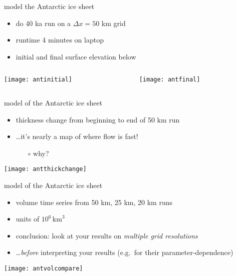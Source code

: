 \begin{frame}{model the Antarctic ice sheet }

\begin{itemize}
\item do 40 ka run on a $\Delta x=50$ km grid
\item runtime 4 minutes on laptop
\item initial and final surface elevation below
\end{itemize}

\bigskip
\begin{columns}
\begin{column}{0.4\textwidth}
\texttt{[image: antinitial]}
\end{column}
\begin{column}{0.55\textwidth}
\texttt{[image: antfinal]}
\end{column}
\end{columns}
\end{frame}


\begin{frame}{model of the Antarctic ice sheet }

\normalsize
\vspace{-2mm}
\begin{itemize}
\item thickness change from beginning to end of 50 km run
\item \dots it's nearly a map of where flow is fast!
  \begin{itemize}
  \item[$\circ$] why?
  \end{itemize}  
\end{itemize}

\begin{center}
\texttt{[image: antthickchange]}
\end{center}
\end{frame}


\begin{frame}{model of the Antarctic ice sheet }

\normalsize
\begin{itemize}
\item volume time series from {\color{red} 50 km}, {\color{green} 25 km}, {\color{blue} 20 km} runs
\item units of $10^6\,\text{km}^3$
\item conclusion:  look at your results on \emph{multiple grid resolutions}
\item \dots \emph{before} interpreting your results (e.g.~for their parameter-dependence)
\end{itemize}

\bigskip
\begin{center}
\texttt{[image: antvolcompare]}
\end{center}
\end{frame}



